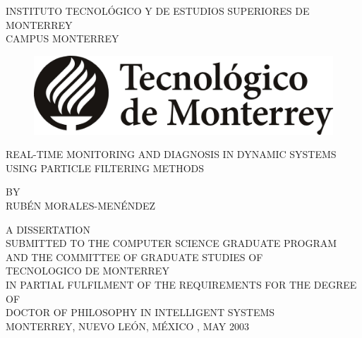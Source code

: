 




\pagestyle{empty} %

\begin{center}
\Large { INSTITUTO TECNOL\'{O}GICO Y DE ESTUDIOS SUPERIORES DE MONTERREY\\}
\normalsize { CAMPUS MONTERREY } \\
\vspace*{1 cm}

\begin{figure}[!h]
 \begin{center}
  \includegraphics[scale=0.2]{pics/LogoTec.jpg}
 \end{center}
\end{figure}
\vspace*{0.6cm}

\Large {REAL-TIME MONITORING AND DIAGNOSIS IN DYNAMIC SYSTEMS \\}
\Large {USING PARTICLE FILTERING METHODS}

\vspace*{1 cm}
\normalsize {BY} \\
\vspace*{1 cm}
\Large {RUB\'{E}N MORALES-MEN\'{E}NDEZ}\\
\vspace*{1.5cm}
\normalsize

A DISSERTATION \\
SUBMITTED TO THE COMPUTER SCIENCE GRADUATE PROGRAM \\
AND THE COMMITTEE OF GRADUATE STUDIES OF\\
TECNOLOGICO DE MONTERREY\\
IN PARTIAL FULFILMENT OF THE REQUIREMENTS FOR THE DEGREE OF \\
\vspace*{1.5cm}
\Large {DOCTOR OF PHILOSOPHY IN INTELLIGENT SYSTEMS} \\
\normalsize
\vspace*{2.5cm}
MONTERREY, NUEVO LE\'{O}N, M\'{E}XICO , MAY 2003\\
\end{center}

